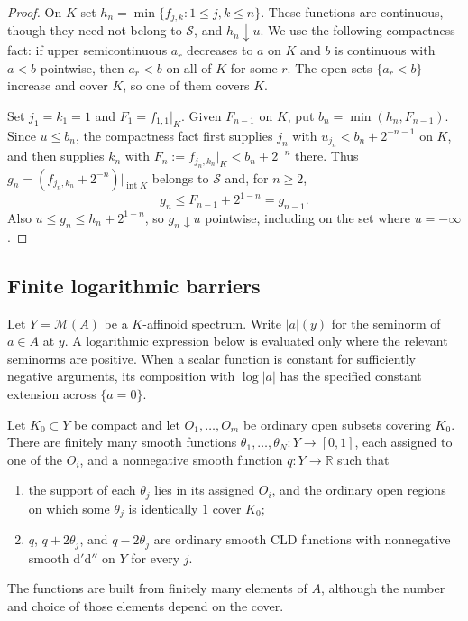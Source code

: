 \begin{proof}
On $K$ set $h_n=\min\{f_{j,k}:1\leq j,k\leq n\}$. These functions are continuous, though they need not belong to $\mathscr{S}$, and $h_n\downarrow u$. We use the following compactness fact: if upper semicontinuous $a_r$ decreases to $a$ on $K$ and $b$ is continuous with $a<b$ pointwise, then $a_r<b$ on all of $K$ for some $r$. The open sets $\{a_r<b\}$ increase and cover $K$, so one of them covers $K$.

Set $j_1=k_1=1$ and $F_1=f_{1,1}|_K$. Given $F_{n-1}$ on $K$, put $b_n=\min(h_n,F_{n-1})$. Since $u\leq b_n$, the compactness fact first supplies $j_n$ with $u_{j_n}<b_n+2^{-n-1}$ on $K$, and then supplies $k_n$ with $F_n:=f_{j_n,k_n}|_K<b_n+2^{-n}$ there. Thus $g_n=(f_{j_n,k_n}+2^{-n})|_{\operatorname{int}K}$ belongs to $\mathscr{S}$ and, for $n\geq2$,
\[
g_n\leq F_{n-1}+2^{1-n}=g_{n-1}.
\]
Also $u\leq g_n\leq h_n+2^{1-n}$, so $g_n\downarrow u$ pointwise, including on the set where $u=-\infty$.
\end{proof}

\subsection{Finite logarithmic barriers}
\label{sec:supplied-p071a-barriers}

Let $Y=\mathcal{M}(A)$ be a $K$-affinoid spectrum. Write $|a|(y)$ for the seminorm of $a\in A$ at $y$. A logarithmic expression below is evaluated only where the relevant seminorms are positive. When a scalar function is constant for sufficiently negative arguments, its composition with $\log|a|$ has the specified constant extension across $\{a=0\}$.

\begin{lemma}
\label{lem:supplied-p071a-affinoid-barriers}
Let $K_0\subset Y$ be compact and let $O_1,\ldots,O_m$ be ordinary open subsets covering $K_0$. There are finitely many smooth functions $\theta_1,\ldots,\theta_N:Y\to[0,1]$, each assigned to one of the $O_i$, and a nonnegative smooth function $q:Y\to\mathbb{R}$ such that
\begin{enumerate}
\item the support of each $\theta_j$ lies in its assigned $O_i$, and the ordinary open regions on which some $\theta_j$ is identically $1$ cover $K_0$;
\item $q$, $q+2\theta_j$, and $q-2\theta_j$ are ordinary smooth CLD functions with nonnegative smooth $\mathrm{d}'\mathrm{d}''$ on $Y$ for every $j$.
\end{enumerate}
The functions are built from finitely many elements of $A$, although the number and choice of those elements depend on the cover.
\end{lemma}

